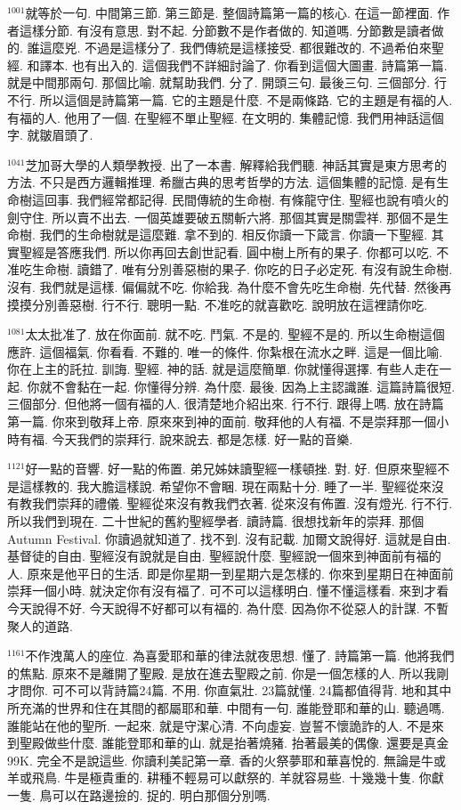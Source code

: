 \documentclass{book}
\begin{document}
$^{1001}$就等於一句.
中間第三節.
第三節是.
整個詩篇第一篇的核心.
在這一節裡面.
作者這樣分節.
有沒有意思.
對不起.
分節數不是作者做的.
知道嗎.
分節數是讀者做的.
誰這麼兇.
不過是這樣分了.
我們傳統是這樣接受.
都很難改的.
不過希伯來聖經.
和譯本.
也有出入的.
這個我們不詳細討論了.
你看到這個大圖畫.
詩篇第一篇.
就是中間那兩句.
那個比喻.
就幫助我們.
分了.
開頭三句.
最後三句.
三個部分.
行不行.
所以這個是詩篇第一篇.
它的主題是什麼.
不是兩條路.
它的主題是有福的人.
有福的人.
他用了一個.
在聖經不單止聖經.
在文明的.
集體記憶.
我們用神話這個字.
就皺眉頭了.

$^{1041}$芝加哥大學的人類學教授.
出了一本書.
解釋給我們聽.
神話其實是東方思考的方法.
不只是西方邏輯推理.
希臘古典的思考哲學的方法.
這個集體的記憶.
是有生命樹這回事.
我們經常都記得.
民間傳統的生命樹.
有條龍守住.
聖經也說有噴火的劍守住.
所以賣不出去.
一個英雄要破五關斬六將.
那個其實是關雲祥.
那個不是生命樹.
我們的生命樹就是這麼難.
拿不到的.
相反你讀一下箴言.
你讀一下聖經.
其實聖經是答應我們.
所以你再回去創世記看.
圓中樹上所有的果子.
你都可以吃.
不准吃生命樹.
讀錯了.
唯有分別善惡樹的果子.
你吃的日子必定死.
有沒有說生命樹.
沒有.
我們就是這樣.
偏偏就不吃.
你給我.
為什麼不會先吃生命樹.
先代替.
然後再摸摸分別善惡樹.
行不行.
聰明一點.
不准吃的就喜歡吃.
說明放在這裡請你吃.

$^{1081}$太太批准了.
放在你面前.
就不吃.
鬥氣.
不是的.
聖經不是的.
所以生命樹這個應許.
這個福氣.
你看看.
不難的.
唯一的條件.
你紮根在流水之畔.
這是一個比喻.
你在上主的託拉.
訓誨.
聖經.
神的話.
就是這麼簡單.
你就懂得選擇.
有些人走在一起.
你就不會黏在一起.
你懂得分辨.
為什麼.
最後.
因為上主認識誰.
這篇詩篇很短.
三個部分.
但他將一個有福的人.
很清楚地介紹出來.
行不行.
跟得上嗎.
放在詩篇第一篇.
你來到敬拜上帝.
原來來到神的面前.
敬拜他的人有福.
不是崇拜那一個小時有福.
今天我們的崇拜行.
說來說去.
都是怎樣.
好一點的音樂.

$^{1121}$好一點的音響.
好一點的佈置.
弟兄姊妹讀聖經一樣頓挫.
對.
好.
但原來聖經不是這樣教的.
我大膽這樣說.
希望你不會睏.
現在兩點十分.
睡了一半.
聖經從來沒有教我們崇拜的禮儀.
聖經從來沒有教我們衣著.
從來沒有佈置.
沒有燈光.
行不行.
所以我們到現在.
二十世紀的舊約聖經學者.
讀詩篇.
很想找新年的崇拜.
那個Autumn Festival.
你讀過就知道了.
找不到.
沒有記載.
加爾文說得好.
這就是自由.
基督徒的自由.
聖經沒有說就是自由.
聖經說什麼.
聖經說一個來到神面前有福的人.
原來是他平日的生活.
即是你星期一到星期六是怎樣的.
你來到星期日在神面前崇拜一個小時.
就決定你有沒有福了.
可不可以這樣明白.
懂不懂這樣看.
來到才看今天說得不好.
今天說得不好都可以有福的.
為什麼.
因為你不從惡人的計謀.
不暫聚人的道路.

$^{1161}$不作洩萬人的座位.
為喜愛耶和華的律法就夜思想.
懂了.
詩篇第一篇.
他將我們的焦點.
原來不是離開了聖殿.
是放在進去聖殿之前.
你是一個怎樣的人.
所以我剛才問你.
可不可以背詩篇24篇.
不用.
你直氣壯.
23篇就懂.
24篇都值得背.
地和其中所充滿的世界和住在其間的都屬耶和華.
中間有一句.
誰能登耶和華的山.
聽過嗎.
誰能站在他的聖所.
一起來.
就是守潔心清.
不向虛妄.
豈誓不懷詭詐的人.
不是來到聖殿做些什麼.
誰能登耶和華的山.
就是抬著燒豬.
抬著最美的偶像.
還要是真金99K.
完全不是說這些.
你讀利美記第一章.
香的火祭夢耶和華喜悅的.
無論是牛或羊或飛鳥.
牛是極貴重的.
耕種不輕易可以獻祭的.
羊就容易些.
十幾幾十隻.
你獻一隻.
鳥可以在路邊撿的.
捉的.
明白那個分別嗎.
\end{document}
